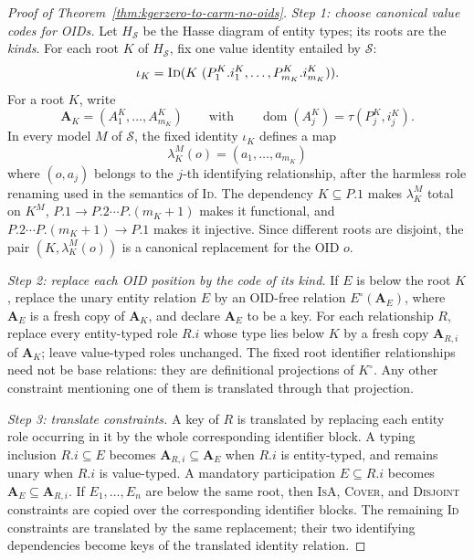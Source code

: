 \documentclass[10pt]{article}
\begin{document}
\begin{proof}[Proof of Theorem~\ref{thm:kgerzero-to-carm-no-oids}]
\emph{Step 1: choose canonical value codes for OIDs.}
Let \(H_{\mathcal S}\) be the Hasse diagram of entity types; its roots
are the \emph{kinds}.  For each
root $K$ of \(H_{\mathcal S}\), fix one value identity entailed by
$\mathcal S$:
\[
  \iota_K=\textsc{Id}
  (K\ (P^K_1.i^K_1,\ldots,P^K_{m_K}.i^K_{m_K})).
\]
For a root $K$, write
\[
  \mathbf A_K=(A^K_1,\ldots,A^K_{m_K})
  \qquad\text{with}\qquad
  \operatorname{dom}(A^K_j)=\tau(P^K_j,i^K_j).
\]
In every model $M$ of $\mathcal S$, the fixed identity $\iota_K$ defines
a map
\[
  \lambda^M_K(o)=(a_1,\ldots,a_{m_K})
\]
where $(o,a_j)$ belongs to the $j$-th identifying relationship, after
the harmless role renaming used in the semantics of \textsc{Id}.  The
dependency $K\subseteq P.1$ makes $\lambda^M_K$ total on $K^M$,
$P.1\to P.2\cdots P.(m_K+1)$ makes it functional, and
$P.2\cdots P.(m_K+1)\to P.1$ makes it injective.  Since different roots
are disjoint, the pair $(K,\lambda^M_K(o))$ is a canonical replacement
for the OID $o$.

\emph{Step 2: replace each OID position by the code of its kind.}
If $E$ is below the root $K$, replace the unary entity relation $E$ by
an OID-free relation $E^\circ(\mathbf A_E)$, where $\mathbf A_E$ is a
fresh copy of $\mathbf A_K$, and declare $\mathbf A_E$ to be a key.  For
each relationship $R$, replace every entity-typed role $R.i$ whose type
lies below $K$ by a fresh copy $\mathbf A_{R,i}$ of $\mathbf A_K$; leave
value-typed roles unchanged.  The fixed root identifier relationships
need not be base relations: they are definitional projections of
$K^\circ$.  Any other constraint mentioning one of them is translated
through that projection.

\emph{Step 3: translate constraints.}
A key of $R$ is translated by replacing each entity role occurring in it
by the whole corresponding identifier block.  A typing inclusion
$R.i\subseteq E$ becomes
$\mathbf A_{R,i}\subseteq\mathbf A_E$ when $R.i$ is entity-typed, and
remains unary when $R.i$ is value-typed.  A mandatory participation
$E\subseteq R.i$ becomes
$\mathbf A_E\subseteq\mathbf A_{R,i}$.  If
$E_1,\ldots,E_n$ are below the same root, then \textsc{IsA},
\textsc{Cover}, and \textsc{Disjoint} constraints are copied over the
corresponding identifier blocks.  The remaining \textsc{Id} constraints
are translated by the same replacement; their two identifying
dependencies become keys of the translated identity relation.


\end{proof}
\end{document}
